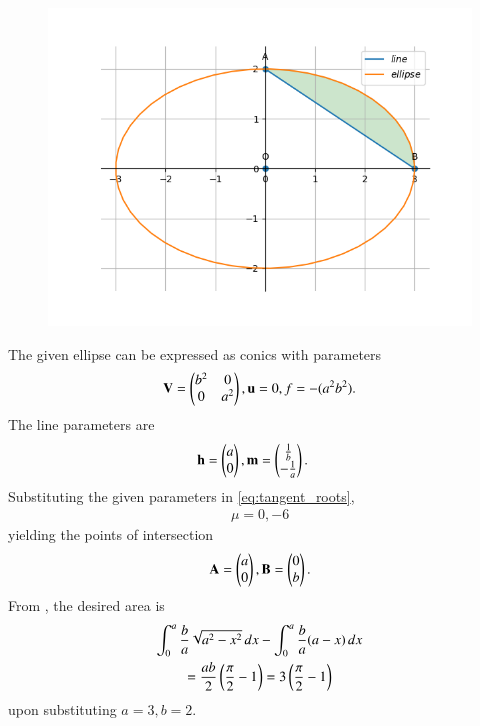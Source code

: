 	\begin{figure}[!h]
		\centering
 \includegraphics[width=\columnwidth]{chapters/12/8/3/8/figs/conic_fig.png}
		\caption{}
		\label{fig:12/8/3/8}
  	\end{figure}
The given ellipse can be expressed as conics with parameters
\begin{align}
\mathbf{V}=\begin{pmatrix}
b^2 & 0\\
0 & a^2
\end{pmatrix},
\mathbf{u}=0,
f=-(a^2b^2).
\end{align} 
The line parameters are
\begin{align}
\mathbf{h} &= \begin{pmatrix}
a\\
0
\end{pmatrix},
\mathbf{m} = \begin{pmatrix}\frac{1}{b} \\ -\frac{1}{a}\end{pmatrix}.
\end{align}
Substituting the given parameters in \eqref{eq:tangent_roots},
\begin{align}
    \mu=0,-6
\end{align}
yielding the points of intersection
\begin{align}
    \mathbf{A}=\begin{pmatrix}
a\\
0
    \end{pmatrix},
    \mathbf{B}=\begin{pmatrix}
0\\
b
    \end{pmatrix}.
\end{align}
From 
		,
the desired area is
\begin{multline}
\int_{0}^{a}\frac{b}{a}\sqrt{a^2-x^2} \,dx 
-\int_{0}^{a} \frac{b}{a}(a-x) \,dx
\\
	= \frac{ab}{2}\left(\frac{\pi}{2}-1\right)
	= 3\left(\frac{\pi}{2}-1\right)
\end{multline}
upon substituting $a=3, b=2$.
